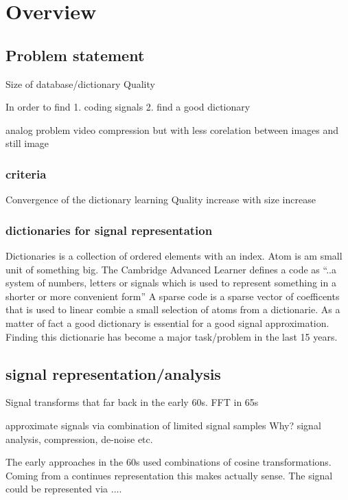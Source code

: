 \chapter{Overview}


\section{Problem statement}
Size of database/dictionary
Quality

In order to find 
1. coding signals 
2. find a good dictionary

analog problem video compression but with less corelation between images and still image 

\subsection{criteria}
Convergence of the dictionary learning
Quality increase with size increase 

\subsection{dictionaries for signal representation}
Dictionaries is a collection of ordered elements with an index.
Atom is am small unit of something big.
The Cambridge Advanced Learner defines a code as ``..a system of numbers, letters or signals which is used to represent something in a shorter or more convenient form''
A sparse code is a sparse vector of coefficents that is used to linear combie a small selection of atoms from a dictionarie.
As a matter of fact a good dictionary is essential for a good signal approximation. \cite{} Finding this dictionarie has become a major task/problem in the last 15 years.

\section{signal representation/analysis}
Signal transforms \cite{sparse intro} that far back in the early 60s.
FFT in 65s

approximate signals via combination of limited signal samples
Why?
signal analysis, compression, de-noise etc.

The early approaches in the 60s used combinations of cosine transformations. Coming from a continues representation this makes 
actually sense. The signal could be represented via ....

